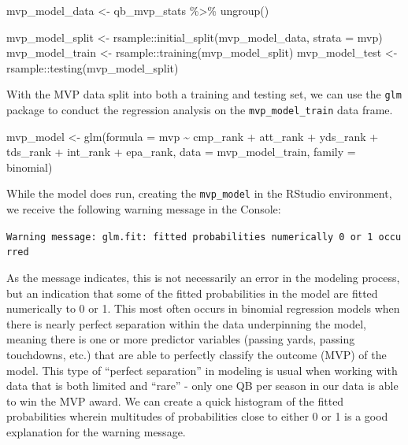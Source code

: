 \documentclass[
  letterpaper,
]{krantz}
\newenvironment{Shaded}{\begin{snugshade}}{\end{snugshade}}
\newcommand{\AttributeTok}[1]{\textcolor[rgb]{0.40,0.45,0.13}{#1}}
\newcommand{\FunctionTok}[1]{\textcolor[rgb]{0.28,0.35,0.67}{#1}}
\newcommand{\NormalTok}[1]{\textcolor[rgb]{0.00,0.23,0.31}{#1}}
\newcommand{\OtherTok}[1]{\textcolor[rgb]{0.00,0.23,0.31}{#1}}
\newcommand{\SpecialCharTok}[1]{\textcolor[rgb]{0.37,0.37,0.37}{#1}}
\begin{document}
\begin{Shaded}
\begin{Highlighting}[]
\NormalTok{mvp\_model\_data }\OtherTok{\textless{}{-}}\NormalTok{ qb\_mvp\_stats }\SpecialCharTok{\%\textgreater{}\%}
  \FunctionTok{ungroup}\NormalTok{()}

\NormalTok{mvp\_model\_split }\OtherTok{\textless{}{-}}\NormalTok{ rsample}\SpecialCharTok{::}\FunctionTok{initial\_split}\NormalTok{(mvp\_model\_data, }\AttributeTok{strata =}\NormalTok{ mvp)}
\NormalTok{mvp\_model\_train }\OtherTok{\textless{}{-}}\NormalTok{ rsample}\SpecialCharTok{::}\FunctionTok{training}\NormalTok{(mvp\_model\_split)}
\NormalTok{mvp\_model\_test }\OtherTok{\textless{}{-}}\NormalTok{ rsample}\SpecialCharTok{::}\FunctionTok{testing}\NormalTok{(mvp\_model\_split)}
\end{Highlighting}
\end{Shaded}

With the MVP data split into both a training and testing set, we can use
the \texttt{glm} package to conduct the regression analysis on the
\texttt{mvp\_model\_train} data frame.

\begin{Shaded}
\begin{Highlighting}[]
\NormalTok{mvp\_model }\OtherTok{\textless{}{-}} \FunctionTok{glm}\NormalTok{(}\AttributeTok{formula =}\NormalTok{ mvp }\SpecialCharTok{\textasciitilde{}}\NormalTok{ cmp\_rank }\SpecialCharTok{+}\NormalTok{ att\_rank }\SpecialCharTok{+}\NormalTok{ yds\_rank }\SpecialCharTok{+}
\NormalTok{                   tds\_rank }\SpecialCharTok{+}\NormalTok{ int\_rank }\SpecialCharTok{+}\NormalTok{ epa\_rank,}
                 \AttributeTok{data =}\NormalTok{ mvp\_model\_train, }\AttributeTok{family =}\NormalTok{ binomial)}
\end{Highlighting}
\end{Shaded}

While the model does run, creating the \texttt{mvp\_model} in the
RStudio environment, we receive the following warning message in the
Console:

\texttt{Warning\ message:\ glm.fit:\ fitted\ probabilities\ numerically\ 0\ or\ 1\ occurred}

As the message indicates, this is not necessarily an error in the
modeling process, but an indication that some of the fitted
probabilities in the model are fitted numerically to 0 or 1. This most
often occurs in binomial regression models when there is nearly perfect
separation within the data underpinning the model, meaning there is one
or more predictor variables (passing yards, passing touchdowns, etc.)
that are able to perfectly classify the outcome (MVP) of the model. This
type of ``perfect separation'' in modeling is usual when working with
data that is both limited and ``rare'' - only one QB per season in our
data is able to win the MVP award. We can create a quick histogram of
the fitted probabilities wherein multitudes of probabilities close to
either 0 or 1 is a good explanation for the warning message.
\end{document}
